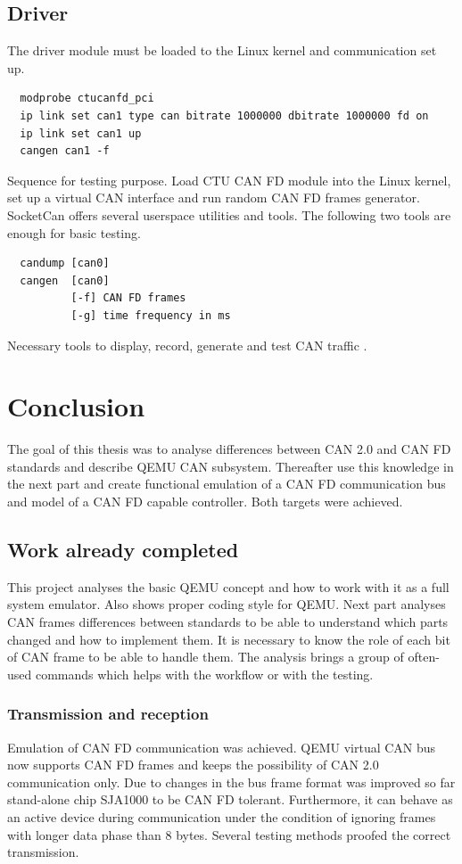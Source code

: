 \documentclass{ctuthesis}
\begin{document}
 \section{Driver}
 The driver module must be loaded to the Linux kernel and communication set up.
 \begin{verbatim}  modprobe ctucanfd_pci
  ip link set can1 type can bitrate 1000000 dbitrate 1000000 fd on
  ip link set can1 up
  cangen can1 -f\end{verbatim}
 Sequence for testing purpose. Load CTU CAN FD module into the Linux kernel, set up a virtual CAN interface and run random CAN FD frames generator.\\
 SocketCan offers several userspace utilities and tools. The following two tools are enough for basic testing.
 \begin{verbatim}  candump [can0]
  cangen  [can0]
          [-f] CAN FD frames
          [-g] time frequency in ms\end{verbatim}
 Necessary tools to display, record, generate and test CAN traffic \cite{can-utils}.

 
\chapter{Conclusion}
 The goal of this thesis was to analyse differences between CAN 2.0 and CAN FD standards and describe QEMU CAN subsystem. Thereafter use this knowledge in the next part and create functional emulation of a CAN FD communication bus and model of a CAN FD capable controller. Both targets were achieved.

 \section{Work already completed}
  This project analyses the basic QEMU concept and how to work with it as a full system emulator. Also shows proper coding style for QEMU.  Next part analyses CAN frames differences between standards to be able to understand which parts changed and how to implement them. It is necessary to know the role of each bit of CAN frame to be able to handle them. The analysis brings a group of often-used commands which helps with the workflow or with the testing.
 
 \subsection{Transmission and reception}
  Emulation of CAN FD communication was achieved. QEMU virtual CAN bus now supports CAN FD frames and keeps the possibility of CAN 2.0 communication only. Due to changes in the bus frame format was improved so far stand-alone chip SJA1000 to be CAN FD tolerant. Furthermore, it can behave as an active device during communication under the condition of ignoring frames with longer data phase than 8 bytes. Several testing methods proofed the correct transmission.
\end{document}
